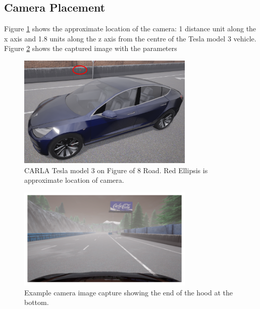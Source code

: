 \subsection{Camera Placement}



Figure \ref{fig:/tesla-model-3-camera-location} shows the approximate location of the camera: 1 distance unit along the x axis and 1.8 units along the z axis from the centre of the Tesla model 3 vehicle. Figure \ref{fig:/tesla-model-3-camera-image} shows the captured image with the parameters 

\begin{figure}[h]
    \centering
    \includegraphics[width=0.75\textwidth]{Figures/Methods/tesla-model-3-camera-location.png}
    \caption{CARLA Tesla model 3 on Figure of 8 Road. Red Ellipsis is approximate location of camera.}
    \label{fig:/tesla-model-3-camera-location}
\end{figure}

\begin{figure}[h]
    \centering
    \includegraphics[width=0.75\textwidth]{Figures/Methods/tesla-model-3-camera-image.png}
    \caption{Example camera image capture showing the end of the hood at the bottom.}
    \label{fig:/tesla-model-3-camera-image}
\end{figure}

